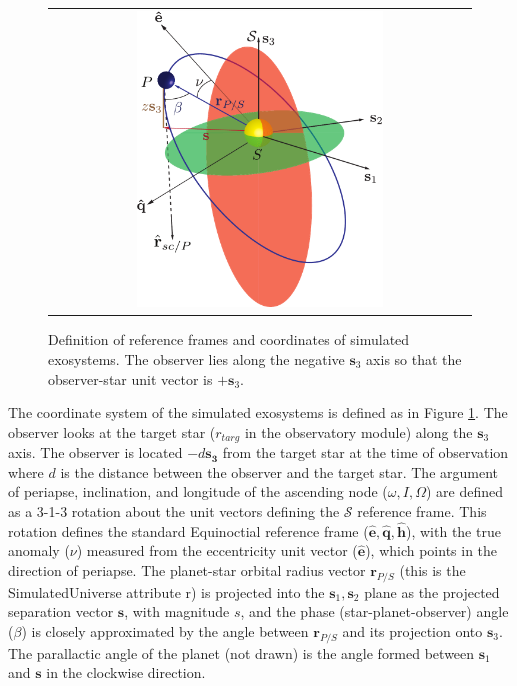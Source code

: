 \documentclass[cleanfoot]{asme2ej}
\def\mf{\mathbf}
\newcommand{\mfhat}[1]{\mf{\hat{#1}}}
\newcommand{\reffig}[1]{Figure \ref{#1}}
\begin{document}
\begin{figure}[ht]
    \begin{center}
        \begin{tabular}{c}
             \includegraphics[width=0.6\textwidth]{orbit_diagram}
        \end{tabular}
    \end{center}
    \caption{\label{fig:orbit_diagram} Definition of reference frames and coordinates of simulated exosystems.  The observer lies along the negative $\mf s_3$ axis so that the observer-star unit vector is $+\mf s_3$.}
\end{figure}

The coordinate system of the simulated exosystems is defined as in \reffig{fig:orbit_diagram}.  The observer looks at the target star ($r_{targ}$ in the observatory module) along the $\mathbf{s}_3$ axis. The observer is located $-d\mathbf{s_3}$ from the target star at the time of observation where $d$ is the distance between the observer and the target star. The argument of periapse, inclination,  and longitude of the ascending node ($\omega, I, \Omega$) are defined as a 3-1-3 rotation about the unit vectors defining the $\mathcal{S}$ reference frame.  This rotation defines the standard Equinoctial reference frame ($\mfhat{e}, \mfhat{q}, \mfhat{h}$), with the true anomaly ($\nu$) measured from the eccentricity unit vector ($\mfhat{e}$), which points in the direction of periapse.  The planet-star orbital radius vector $\mf r_{P/S}$ (this is the SimulatedUniverse attribute r) is projected into the $\mf s_1, \mf s_2$ plane as the projected separation vector $\mf s$, with magnitude $s$, and the phase (star-planet-observer) angle ($\beta$) is closely approximated by the angle between $\mf r_{P/S}$ and its projection onto $\mf s_3$. The parallactic angle of the planet (not drawn) is the angle formed between $\mf s_1$ and $\mf s$ in the clockwise direction.
\end{document}
